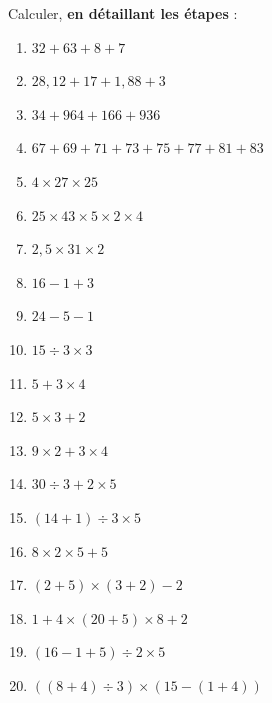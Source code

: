 \documentclass[14 pt]{extarticle}
\theoremstyle{plain}
\begin{document}
Calculer, \textbf{en détaillant les étapes} : \begin{enumerate}
\item $32 + 63 + 8 + 7$
\item $28,12 + 17 + 1, 88 + 3$
\item $34 + 964 + 166 + 936$
\item $ 67 + 69 + 71 + 73 + 75 +77 +81 +83 $
\item $4 \times 27 \times 25$ 
\item $25 \times 43\times 5 \times 2 \times 4$
\item $ 2,5 \times 31 \times 2 $
\item $ 16 - 1 + 3$
\item $ 24 - 5 - 1$
\item $15\div 3 \times 3$
\item $5 + 3 \times 4$
\item $ 5 \times 3 + 2$
\item $ 9 \times 2 + 3 \times 4$
\item $ 30 \div 3 + 2 \times 5$
\item $ (14 +1)\div 3 \times 5$
\item $ 8 \times 2 \times 5 + 5$
\item $(2+5) \times (3+2) - 2$
\item $ 1 + 4 \times (20 + 5) \times 8 + 2$
\item $ (16 - 1 + 5)\div 2 \times 5$
\item $ ( ( 8 + 4 ) \div 3 ) \times ( 15 - ( 1 + 4 ) )$
\end{enumerate}

 	
\end{document}
